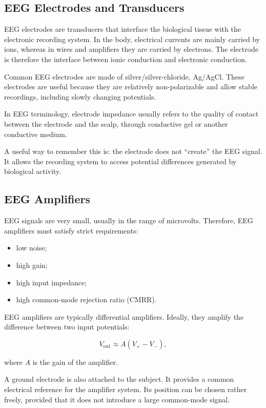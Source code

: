 \subsection{EEG Electrodes and Transducers}

EEG electrodes are transducers that interface the biological tissue with the electronic recording system. In the body, electrical currents are mainly carried by ions, whereas in wires and amplifiers they are carried by electrons. The electrode is therefore the interface between ionic conduction and electronic conduction.

Common EEG electrodes are made of silver/silver-chloride, Ag/AgCl. These electrodes are useful because they are relatively non-polarizable and allow stable recordings, including slowly changing potentials.

In EEG terminology, electrode impedance usually refers to the quality of contact between the electrode and the scalp, through conductive gel or another conductive medium.

\begin{authornote}
A useful way to remember this is: the electrode does not ``create'' the EEG signal. It allows the recording system to access potential differences generated by biological activity.
\end{authornote}

\subsection{EEG Amplifiers}

EEG signals are very small, usually in the range of microvolts. Therefore, EEG amplifiers must satisfy strict requirements:

\begin{itemize}[noitemsep]
    \item low noise;
    \item high gain;
    \item high input impedance;
    \item high common-mode rejection ratio (CMRR).
\end{itemize}

EEG amplifiers are typically differential amplifiers. Ideally, they amplify the difference between two input potentials:

\[
V_{\text{out}} \approx A(V_{+} - V_{-}),
\]

where $A$ is the gain of the amplifier.

A ground electrode is also attached to the subject. It provides a common electrical reference for the amplifier system. Its position can be chosen rather freely, provided that it does not introduce a large common-mode signal.

